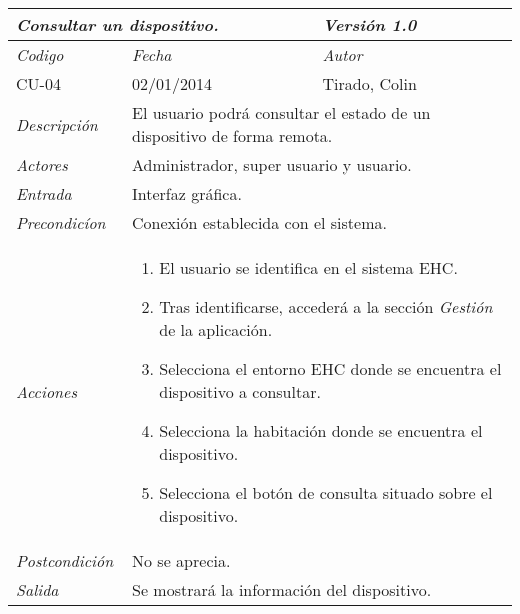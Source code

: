 \begin{center}
    \begin{tabular}{|p{3cm}|p{4cm}|p{4cm}|p{4cm}|}
    \hline \multicolumn{3}{|p{9cm}|}{\textit{Consultar un dispositivo.}} & \textit{Versi\'on 1.0} \\
	\hline \textit{Codigo} & \textit{Fecha} & \multicolumn{2}{|p{6cm}|}{\textit{Autor}} \\
	CU-04 & 02/01/2014 & \multicolumn{2}{|p{6cm}|}{Tirado, Colin} \\		
    \hline \textit{Descripci\'on} & \multicolumn{3}{|p{9cm}|}{El usuario podr\'a consultar el estado de un dispositivo de forma remota.} \\
    \hline \textit{Actores} & \multicolumn{3}{|p{9cm}|}{Administrador, super usuario y usuario.} \\
    \hline \textit{Entrada} & \multicolumn{3}{|p{9cm}|}{Interfaz gr\'afica.} \\
    \hline \textit{Precondic\'ion} & \multicolumn{3}{|p{9cm}|}{Conexi\'on establecida con el sistema.} \\
    \hline \textit{Acciones} & \multicolumn{3}{|p{9cm}|}{
        \begin{enumerate}
        \item El usuario se identifica en el sistema EHC.
        \item Tras identificarse, acceder\'a a la secci\'on \textit{Gesti\'on} de la aplicaci\'on.
        \item Selecciona el entorno EHC donde se encuentra el dispositivo a consultar.
        \item Selecciona la habitaci\'on donde se encuentra el dispositivo.
        \item Selecciona el bot\'on de consulta situado sobre el dispositivo.
        \end{enumerate}
           } \\
    \hline \textit{Postcondici\'on} & \multicolumn{3}{|p{9cm}|}{No se aprecia.} \\
    \hline \textit{Salida} & \multicolumn{3}{|p{9cm}|}{Se mostrar\'a la informaci\'on del dispositivo.} \\ \hline
    \end{tabular}
\end{center}